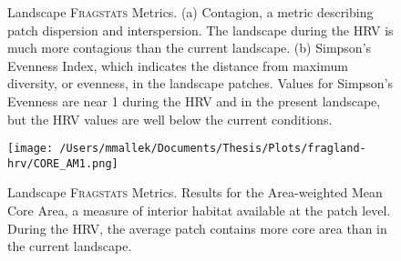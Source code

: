 \begin{figure}[!htbp]
  \centering
\caption{Landscape \textsc{Fragstats} Metrics. (a) Contagion, a metric describing patch dispersion and interspersion. The landscape during the HRV is much more contagious than the current landscape. (b) Simpson's Evenness Index, which indicates the distance from maximum diversity, or evenness, in the landscape patches. Values for Simpson's Evenness are near 1 during the HRV and in the present landscape, but the HRV values are well below the current conditions.} 
\label{fig:fragland_contagsiei}
\end{figure}

\begin{figure}[!htbp]
  \centering
  \texttt{[image: /Users/mmallek/Documents/Thesis/Plots/fragland-hrv/CORE\_AM1.png]}
\caption{Landscape \textsc{Fragstats} Metrics. Results for the Area-weighted Mean Core Area, a measure of interior habitat available at the patch level. During the HRV, the average patch contains more core area than in the current landscape.} 
\label{fig:fragland_core}
\end{figure}
